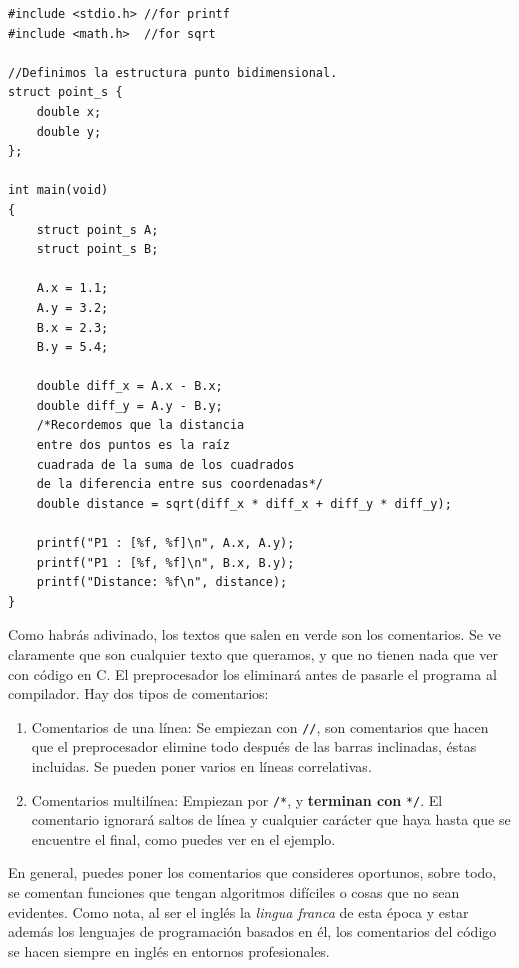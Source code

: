 \documentclass[a4paper]{article}
\begin{document}
\noindent
\begin{minipage}[H]{\linewidth}
\mbox{}
\begin{lstlisting}[style=C,
caption={Ejemplo de definición de estructura punto},
label={lst:comments1}]
#include <stdio.h> //for printf
#include <math.h>  //for sqrt

//Definimos la estructura punto bidimensional.
struct point_s {
    double x;
    double y;
};

int main(void)
{
    struct point_s A;
    struct point_s B;

    A.x = 1.1;
    A.y = 3.2;
    B.x = 2.3;
    B.y = 5.4;

    double diff_x = A.x - B.x;
    double diff_y = A.y - B.y;
    /*Recordemos que la distancia
    entre dos puntos es la raíz
    cuadrada de la suma de los cuadrados
    de la diferencia entre sus coordenadas*/
    double distance = sqrt(diff_x * diff_x + diff_y * diff_y);

    printf("P1 : [%f, %f]\n", A.x, A.y);
    printf("P1 : [%f, %f]\n", B.x, B.y);
    printf("Distance: %f\n", distance);
}
\end{lstlisting}
\end{minipage}

Como habrás adivinado, los textos que salen en verde son los comentarios. Se ve
claramente que son cualquier texto que queramos, y que no tienen nada que ver
con código en C. El preprocesador los eliminará antes de pasarle el programa al
compilador. Hay dos tipos de comentarios:
\begin{enumerate}
\item Comentarios de una línea: Se empiezan con \verb!//!, son comentarios que
hacen que el preprocesador elimine todo después de las barras inclinadas, éstas
incluidas. Se pueden poner varios en líneas correlativas.
\item Comentarios multilínea: Empiezan por \verb!/*!, y \textbf{terminan con}
\verb!*/!. El comentario ignorará saltos de línea y cualquier carácter que
haya hasta que se encuentre el final, como puedes ver en el ejemplo.
\end{enumerate}

En general, puedes poner los comentarios que consideres oportunos, sobre todo,
se comentan funciones que tengan algoritmos difíciles o cosas que no sean
evidentes. Como nota, al ser el inglés la \emph{lingua franca} de esta época y
estar además los lenguajes de programación basados en él, los comentarios del
código se hacen siempre en inglés en entornos profesionales.
\end{document}
